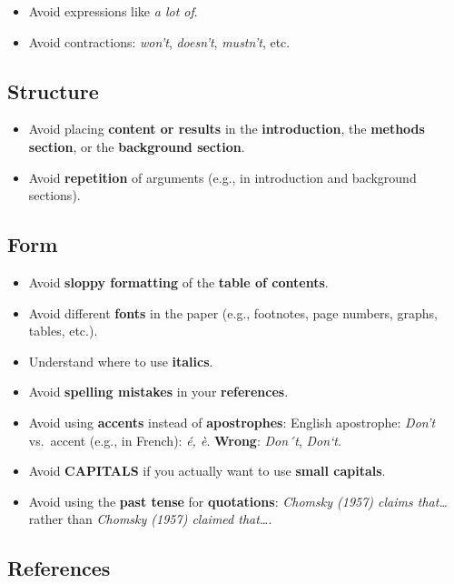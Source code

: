 \documentclass[
  11pt,
  letterpaper,
  DIV=11,
  numbers=noendperiod]{scrreprt}
\providecommand{\tightlist}{%
  \setlength{\itemsep}{0pt}\setlength{\parskip}{0pt}}\usepackage{longtable,booktabs,array}
\begin{document}
\begin{itemize}
\tightlist
\item
  Avoid expressions like \emph{a lot of}.
\item
  Avoid contractions: \emph{won't}, \emph{doesn't}, \emph{mustn't}, etc.
\end{itemize}

\subsection{Structure}\label{structure}

\begin{itemize}
\tightlist
\item
  Avoid placing \textbf{content or results} in the
  \textbf{introduction}, the \textbf{methods section}, or the
  \textbf{background section}.
\item
  Avoid \textbf{repetition} of arguments (e.g., in introduction and
  background sections).
\end{itemize}

\subsection{Form}\label{form}

\begin{itemize}
\tightlist
\item
  Avoid \textbf{sloppy formatting} of the \textbf{table of contents}.
\item
  Avoid different \textbf{fonts} in the paper (e.g., footnotes, page
  numbers, graphs, tables, etc.).
\item
  Understand where to use \textbf{italics}.
\item
  Avoid \textbf{spelling mistakes} in your \textbf{references}.
\item
  Avoid using \textbf{accents} instead of \textbf{apostrophes}: English
  apostrophe: \emph{Don't} vs.~accent (e.g., in French): \emph{é, è}.
  \textbf{Wrong}: \emph{Don´t}, \emph{Don`t}.
\item
  Avoid \textbf{CAPITALS} if you actually want to use \textbf{small
  capitals}.
\item
  Avoid using the \textbf{past tense} for \textbf{quotations}:
  \emph{Chomsky (1957) claims that\ldots{}} rather than \emph{Chomsky
  (1957) claimed that\ldots{}}.
\end{itemize}

\subsection{References}\label{references}
\end{document}
